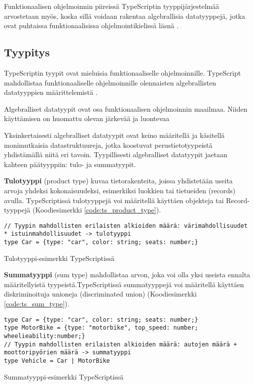 Funktionaalisen ohjelmoinnin piireissä TypeScriptin tyyppijärjestelmää arvostetaan myös, koska sillä voidaan rakentaa algebrallisia datatyyppejä, jotka ovat puhtaissa funktionaalisissa ohjelmointikielissä läsnä \cite{holvikari2021category}.


\subsection{Tyypitys}

TypeScriptin tyypit ovat mieluisia funktionaaliselle ohjelmoinnille. TypeScript mahdollistaa funktionaaliselle ohjelmoinnille olennaisten algebrallisten datatyyppien määrittelemistä \cite{holvikari2021category}.

Algebralliset datatyypit ovat osa funktionaalisen ohjelmoinnin maailmaa. Niiden käyttämisen on huomattu olevan järkevää ja luontevaa \cite{holvikari2021category,hickey_maybe_not,algebraic_data_types}

Yksinkertaisesti algebralliset datatyypit ovat keino määritellä ja käsitellä monimutkaisia datastruktuureja, jotka koostuvat perustietotyypeistä yhdistämällä niitä eri tavoin. Tyypillisesti algebralliset datatyypit jaetaan kahteen päätyyppiin: tulo- ja summatyypit.

\textbf{Tulotyyppi} (product type) kuvaa tietorakenteita, joissa yhdistetään useita arvoja yhdeksi kokonaisuudeksi, esimerkiksi luokkien tai tietueiden (records) avulla.
TypeScriptissä tulotyyppejä voi määritellä käyttäen objekteja tai Record-tyyppejä (Koodiesimerkki \ref{code:ts_product_type}). \citep{algebraic_data_types,holvikari2021category}

\begin{code}
    \begin{verbatim}
// Tyypin mahdollisten erilaisten alkioiden määrä: värimahdollisuudet * istuinmahdollisuudet -> tulotyyppi
type Car = {type: "car", color: string; seats: number;}
\end{verbatim}
    \caption{Tulotyyppi-esimerkki TypeScriptissä}
    \label{code:ts_product_type}
\end{code}

\textbf{Summatyyppi} (sum type) mahdollistaa arvon, joka voi olla yksi useista ennalta määritellyistä tyypeistä.TypeScriptissä summatyyppejä voi määritellä käyttäen diskriminoituja unioneja (discriminated union) (Koodiesimerkki \ref{code:ts_sum_type}). \citep{algebraic_data_types,holvikari2021category}

\begin{code}
    \begin{verbatim}
type Car = {type: "car", color: string; seats: number;}
type MotorBike = {type: "motorbike", top_speed: number; wheelieability:number;}
// Tyypin mahdollisten erilaisten alkioiden määrä: autojen määrä + moottoripyörien määrä -> summatyyppi
type Vehicle = Car | MotorBike
\end{verbatim}
    \caption{Summatyyppi-esimerkki TypeScriptissä}
    \label{code:ts_sum_type}
\end{code}


